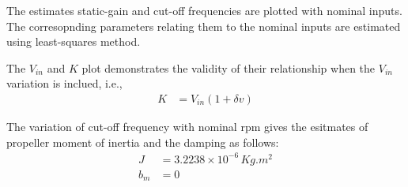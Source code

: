 The estimates static-gain and cut-off frequencies are plotted with nominal inputs. The corresopnding parameters relating them to the nominal inputs are estimated using least-squares method.

The $V_{in}$ and $K$ plot demonstrates the validity of their relationship when the $V_{in}$ variation is inclued, i.e.,
\begin{align*}
    K &= V_{in} (1 + \delta v)
\end{align*}

The variation of cut-off frequency with nominal rpm gives the esitmates of propeller moment of inertia and the damping as follows:
\begin{align*}
    J &= 3.2238 \times 10^{-6} \, Kg .m^2\\
    b_m &= 0
\end{align*}

